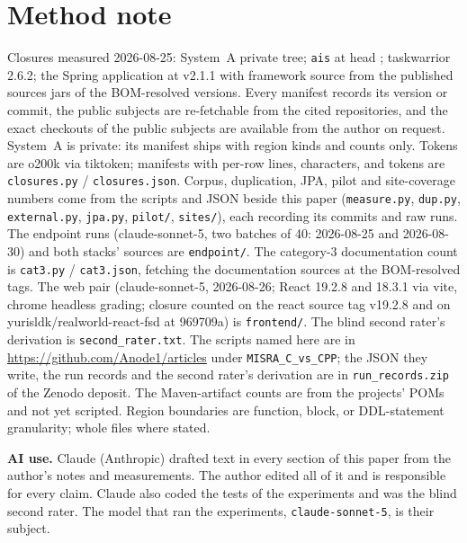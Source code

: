 \documentclass[journal]{IEEEtran}
\begin{document}
\section*{Method note}

Closures measured 2026-08-25: System~A private tree; \texttt{ais} at head
\cite{ais}; taskwarrior 2.6.2; the Spring application at v2.1.1 with
framework source from the published sources jars of the BOM-resolved
versions. Every manifest records its version or commit, the public subjects
are re-fetchable from the cited repositories, and the exact checkouts of
the public subjects are available from the author on request. System~A
is private: its manifest ships with region kinds and counts only. Tokens are o200k via
tiktoken; manifests with per-row lines, characters, and tokens are
\texttt{closures.py} / \texttt{closures.json}. Corpus, duplication, JPA,
pilot and site-coverage numbers come from the scripts and JSON beside this
paper (\texttt{measure.py}, \texttt{dup.py}, \texttt{external.py},
\texttt{jpa.py}, \texttt{pilot/}, \texttt{sites/}), each recording its
commits and raw runs. The endpoint runs (claude-sonnet-5, two batches
of 40: 2026-08-25 and 2026-08-30) and both stacks' sources are
\texttt{endpoint/}. The category-3 documentation count is
\texttt{cat3.py} / \texttt{cat3.json}, fetching the documentation
sources at the BOM-resolved tags. The web pair
(claude-sonnet-5, 2026-08-26; React 19.2.8 and 18.3.1 via vite, chrome
headless grading; closure counted on the react source tag v19.2.8 and
on yurisldk/realworld-react-fsd at 969709a) is \texttt{frontend/}. The blind second rater's derivation is
\texttt{second\_rater.txt}. The scripts named here are in
\url{https://github.com/Anode1/articles} under \texttt{MISRA\_C\_vs\_CPP};
the JSON they write, the run records and the second rater's derivation
are in \texttt{run\_records.zip} of the Zenodo deposit. The Maven-artifact counts are from the projects' POMs
and not yet scripted. Region boundaries are function, block, or
DDL-statement granularity; whole files where stated.

\textbf{AI use.} Claude (Anthropic) drafted text in every section of
this paper from the author's notes and measurements. The author edited
all of it and is responsible for every claim. Claude also coded the
tests of the experiments and was the blind second rater. The model that ran the
experiments, \texttt{claude-sonnet-5}, is their subject.
\end{document}
